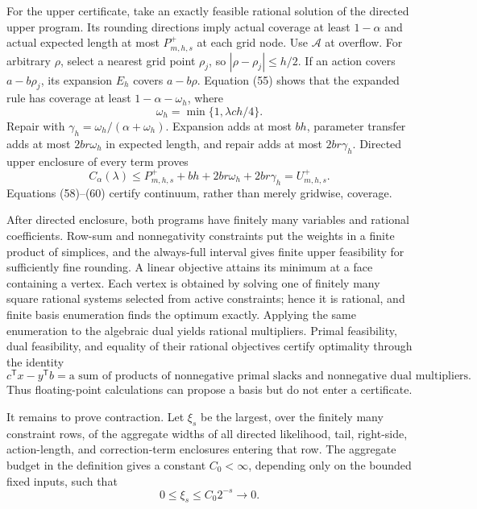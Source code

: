 For the upper certificate, take an exactly feasible rational solution
of the directed upper program.  Its rounding directions imply actual
coverage at least \(1-\alpha\) and actual expected length at most
\(P_{m,h,s}^+\) at each grid node.  Use \(\mathcal A\) at overflow.
For arbitrary \(\rho\), select a nearest grid point \(\rho_j\), so
\(|\rho-\rho_j|\le h/2\).  If an action covers \(a-b\rho_j\), its
expansion \(E_h\) covers \(a-b\rho\).  Equation (55) shows that the
expanded rule has coverage at least \(1-\alpha-\omega_h\), where
\[
 \omega_h=\min\{1,\lambda ch/4\}.
 \tag{59}
\]
Repair with
\(\gamma_h=\omega_h/(\alpha+\omega_h)\).  Expansion adds at most \(bh\),
parameter transfer adds at most \(2br\omega_h\) in expected length, and
repair adds at most \(2br\gamma_h\).  Directed upper enclosure of every
term proves
\[
 C_\alpha(\lambda)
 \le P_{m,h,s}^++bh+2br\omega_h+2br\gamma_h
 =U_{m,h,s}^+.
 \tag{60}
\]
Equations (58)--(60) certify continuum, rather than merely gridwise,
coverage.

After directed enclosure, both programs have finitely many variables
and rational coefficients.  Row-sum and nonnegativity constraints put
the weights in a finite product of simplices, and the always-full
interval gives finite upper feasibility for sufficiently fine
rounding.  A linear objective attains its minimum at a face containing
a vertex.  Each vertex is obtained by solving one of finitely many
square rational systems selected from active constraints; hence it is
rational, and finite basis enumeration finds the optimum exactly.
Applying the same enumeration to the algebraic dual yields rational
multipliers.  Primal feasibility, dual feasibility, and equality of
their rational objectives certify optimality through the identity
\[
 c^{\mathsf T}x-y^{\mathsf T}b
 =
 \text{a sum of products of nonnegative primal slacks and
 nonnegative dual multipliers}.
 \tag{61}
\]
Thus floating-point calculations can propose a basis but do not enter a
certificate.

It remains to prove contraction.  Let \(\xi_s\) be the largest, over the
finitely many constraint rows, of the aggregate widths of all directed
likelihood, tail, right-side, action-length, and correction-term
enclosures entering that row.  The aggregate budget in the definition
gives a constant \(C_0<\infty\), depending only on the bounded fixed
inputs, such that
\[
 0\le\xi_s\le C_0 2^{-s}\longrightarrow0.
 \tag{62}
\]

